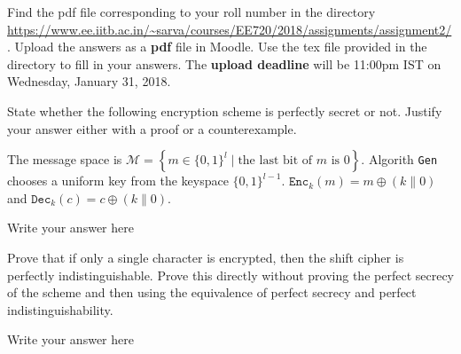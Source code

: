 \documentclass[12pt,a4paper,answers]{exam}
\begin{document}
\pagestyle{head}
\headrule
{}
%

\extraheadheight{.4in}%
\extrafootheight{-0.5in}%
\extrawidth{0.5in}%

Find the pdf file corresponding to your roll number in the directory \url{https://www.ee.iitb.ac.in/~sarva/courses/EE720/2018/assignments/assignment2/}. Upload the answers as a \textbf{pdf} file in Moodle. Use the tex file provided in the directory to fill in your answers. The \textbf{upload deadline} will be 11:00pm IST on Wednesday, January 31, 2018.
\begin{questions}
\question[5] State whether the following encryption scheme is perfectly secret or not. Justify your answer either with a proof or a counterexample.

  The message space is $\mathcal{M} = \left\{ m \in \{0,1\}^l \mid \textrm{the last bit of $m$ is 0} \right\}$. Algorith \texttt{Gen} chooses a uniform key from the keyspace $\{0,1\}^{l-1}$. $\texttt{Enc}_k(m) = m \oplus (k \| 0)$ and $\texttt{Dec}_k(c) = c \oplus (k \| 0)$.
  \begin{solution}
    Write your answer here
  \end{solution}

  \question[5] Prove that if only a single character is encrypted, then the shift cipher is perfectly indistinguishable. Prove this directly without proving the perfect secrecy of the scheme and then using the equivalence of perfect secrecy and perfect indistinguishability.
  \begin{solution}
    Write your answer here
  \end{solution}

  
\end{questions}
\end{document}
